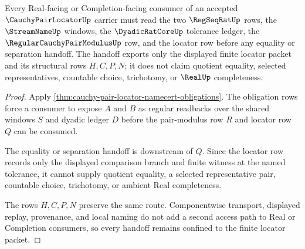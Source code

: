 \begin{theorem}
\label{thm:cauchy-pair-locator-l10-handoff}
Every Real-facing or Completion-facing consumer of an accepted $\CauchyPairLocatorUp$ carrier must read the two $\RegSeqRatUp$ rows, the $\StreamNameUp$ windows, the $\DyadicRatCoreUp$ tolerance ledger, the $\RegularCauchyPairModulusUp$ row, and the locator row before any equality or separation handoff. The handoff exports only the displayed finite locator packet and its structural rows $H,C,P,N$; it does not claim quotient equality, selected representatives, countable choice, trichotomy, or $\RealUp$ completeness.
\end{theorem}
\begin{proof}
Apply \autoref{thm:cauchy-pair-locator-namecert-obligations}. The obligation rows force a consumer to expose $A$ and $B$ as regular readbacks over the shared windows $S$ and dyadic ledger $D$ before the pair-modulus row $R$ and locator row $Q$ can be consumed.

The equality or separation handoff is downstream of $Q$. Since the locator row records only the displayed comparison branch and finite witness at the named tolerance, it cannot supply quotient equality, a selected representative pair, countable choice, trichotomy, or ambient Real completeness.

The rows $H,C,P,N$ preserve the same route. Componentwise transport, displayed replay, provenance, and local naming do not add a second access path to Real or Completion consumers, so every handoff remains confined to the finite locator packet.
\end{proof}





